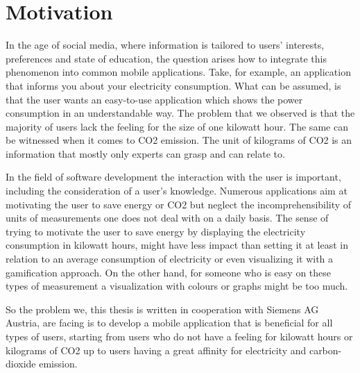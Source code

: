 \documentclass[12pt,a4paper,titlepage,oneside]{article}
\begin{document}
	

\MakeTitleAndTOC




\section{Motivation}
In the age of social media, where information is tailored to users' interests, preferences and state of education, the question arises how to integrate this phenomenon into common mobile applications. Take, for example, an application that informs you about your electricity consumption. What can be assumed, is that the user wants an easy-to-use application which shows the power consumption in an understandable way. The problem that we observed is that the majority of users lack the feeling for the size of one kilowatt hour. The same can be witnessed when it comes to CO2 emission. The unit of kilograms of CO2 is an information that mostly only experts can grasp and can relate to.

In the field of software development the interaction with the user is important, including the consideration of a user's knowledge. Numerous applications aim at motivating the user to save energy or CO2 but neglect the incomprehensibility of units of measurements one does not deal with on a daily basis. The sense of trying to motivate the user to save energy by displaying the electricity consumption in kilowatt hours, might have less impact than setting it at least in relation to an average consumption of electricity or even visualizing it with a gamification approach. On the other hand, for someone who is easy on these types of measurement a visualization with colours or graphs might be too much.

So the problem we, this thesis is written in cooperation with Siemens AG Austria, are facing is to develop a mobile application that is beneficial for all types of users, starting from users who do not have a feeling for kilowatt hours or kilograms of CO2 up to users having a great affinity for electricity and carbon-dioxide emission.
\end{document}
